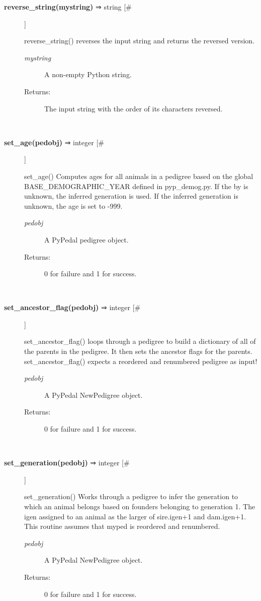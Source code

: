 \documentclass[10pt]{article}
\begin{document}
\begin{description}
\item[\textbf{reverse\_string(mystring)}
 ⇒ string [\#]]

 reverse\_string() reverses the input string and returns the reversed version.
\begin{description}
\item[\emph{mystring}
] A non-empty Python string.
\item[Returns:] The input string with the order of its characters reversed.

\end{description}
\\ 

\item[\textbf{set\_age(pedobj)}
 ⇒ integer [\#]]

 set\_age() Computes ages for all animals in a pedigree based on the global BASE\_DEMOGRAPHIC\_YEAR defined in pyp\_demog.py. If the by is unknown, the inferred generation is used. If the inferred generation is unknown, the age is set to -999.
\begin{description}
\item[\emph{pedobj}
] A PyPedal pedigree object.
\item[Returns:] 0 for failure and 1 for success.

\end{description}
\\ 

\item[\textbf{set\_ancestor\_flag(pedobj)}
 ⇒ integer [\#]]

 set\_ancestor\_flag() loops through a pedigree to build a dictionary of all of the parents in the pedigree. It then sets the ancestor flags for the parents. set\_ancestor\_flag() expects a reordered and renumbered pedigree as input!
\begin{description}
\item[\emph{pedobj}
] A PyPedal NewPedigree object.
\item[Returns:] 0 for failure and 1 for success.

\end{description}
\\ 

\item[\textbf{set\_generation(pedobj)}
 ⇒ integer [\#]]

 set\_generation() Works through a pedigree to infer the generation to which an animal belongs based on founders belonging to generation 1. The igen assigned to an animal as the larger of sire.igen+1 and dam.igen+1. This routine assumes that myped is reordered and renumbered.
\begin{description}
\item[\emph{pedobj}
] A PyPedal NewPedigree object.
\item[Returns:] 0 for failure and 1 for success.


\end{description}
\end{description}
\end{document}
